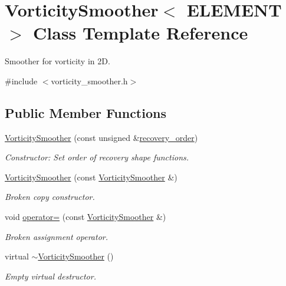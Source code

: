\hypertarget{classVorticitySmoother}{}\section{Vorticity\+Smoother$<$ E\+L\+E\+M\+E\+NT $>$ Class Template Reference}
\label{classVorticitySmoother}


Smoother for vorticity in 2D.  




{\ttfamily \#include $<$vorticity\+\_\+smoother.\+h$>$}

\subsection*{Public Member Functions}
\begin{DoxyCompactItemize}
\item 
\hyperlink{classVorticitySmoother_ae1c778ccf80298ff06ed89f581956b70}{Vorticity\+Smoother} (const unsigned \&\hyperlink{classVorticitySmoother_a05a61dc88d10b4ebd5c932fbea2b026c}{recovery\+\_\+order})
\begin{DoxyCompactList}\small\item\em Constructor\+: Set order of recovery shape functions. \end{DoxyCompactList}\item 
\hyperlink{classVorticitySmoother_a398982f6cd71421234850d34bed3e06f}{Vorticity\+Smoother} (const \hyperlink{classVorticitySmoother}{Vorticity\+Smoother} \&)
\begin{DoxyCompactList}\small\item\em Broken copy constructor. \end{DoxyCompactList}\item 
void \hyperlink{classVorticitySmoother_aeaf3571e328e4b43a9e30de6165b9ea9}{operator=} (const \hyperlink{classVorticitySmoother}{Vorticity\+Smoother} \&)
\begin{DoxyCompactList}\small\item\em Broken assignment operator. \end{DoxyCompactList}\item 
virtual \hyperlink{classVorticitySmoother_a49c513e8cd1c712fb0192ab7a0ddc9eb}{$\sim$\+Vorticity\+Smoother} ()
\begin{DoxyCompactList}\small\item\em Empty virtual destructor. \end{DoxyCompactList}\item 

\end{DoxyCompactItemize}
